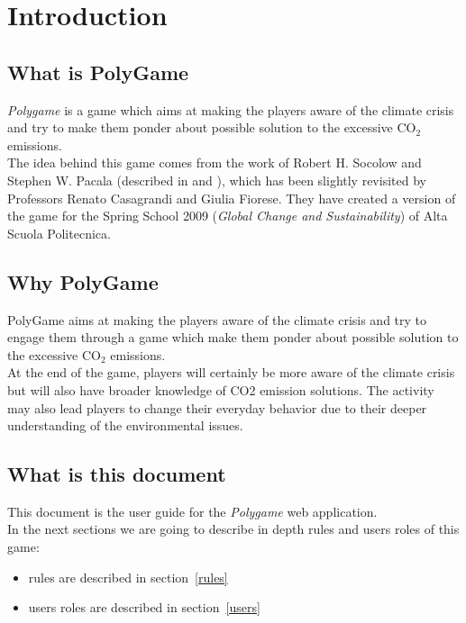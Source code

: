 \section{Introduction}

\subsection{What is PolyGame}
\emph{Polygame} is a game which aims at making the players aware of the climate crisis and try to make them ponder about possible solution to the excessive CO$_{2}$ emissions.\\
The idea behind this game comes from the work of Robert H. Socolow and Stephen W. Pacala (described in \cite{scientificAmerican} and \cite{science}), which has been slightly revisited by Professors Renato Casagrandi and Giulia Fiorese. They have created a version of the game for the Spring School 2009 (\emph{Global Change and Sustainability}) of Alta Scuola Politecnica.


\subsection{Why PolyGame}
PolyGame aims at making the players aware of the climate crisis and try to engage them through a game which make them ponder about possible solution to the excessive CO$_{2}$ emissions.\\
At the end of the game, players will certainly be more aware of the climate crisis but will also have broader knowledge of CO2 emission solutions. The activity may also lead players to change their everyday behavior due to their deeper understanding of the environmental issues.


\subsection{What is this document}
This document is the user guide for the \emph{Polygame} web application.\\
In the next sections we are going to describe in depth rules and users roles of this game:

\begin{itemize}
\item rules are described in section~\ref{rules}
\item users roles are described in section~\ref{users}
\end{itemize}
